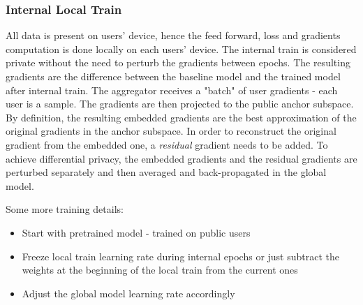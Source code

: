  \subsubsection{Internal Local Train}
 All data is present on users' device, hence the feed forward, loss and gradients computation is done locally on each users' device.
 The internal train is considered private without the need to perturb the gradients between epochs. The resulting gradients are the difference between the baseline model and the trained model after internal train. The aggregator receives a "batch" of user gradients - each user is a sample. The gradients are then projected to the public anchor subspace. By definition, the resulting embedded gradients are the best approximation of the original gradients in the anchor subspace. In order to reconstruct the original gradient from the embedded one, a \textit{residual} gradient needs to be added. To achieve differential privacy, the embedded gradients and the residual gradients are perturbed separately and then averaged and back-propagated in the global model.

Some more training details:
\begin{itemize}
    \item Start with pretrained model - trained on public users
    \item Freeze local train learning rate during internal epochs or just subtract the weights at the beginning of the local train from the current ones
    \item Adjust the global model learning rate accordingly
\end{itemize}




